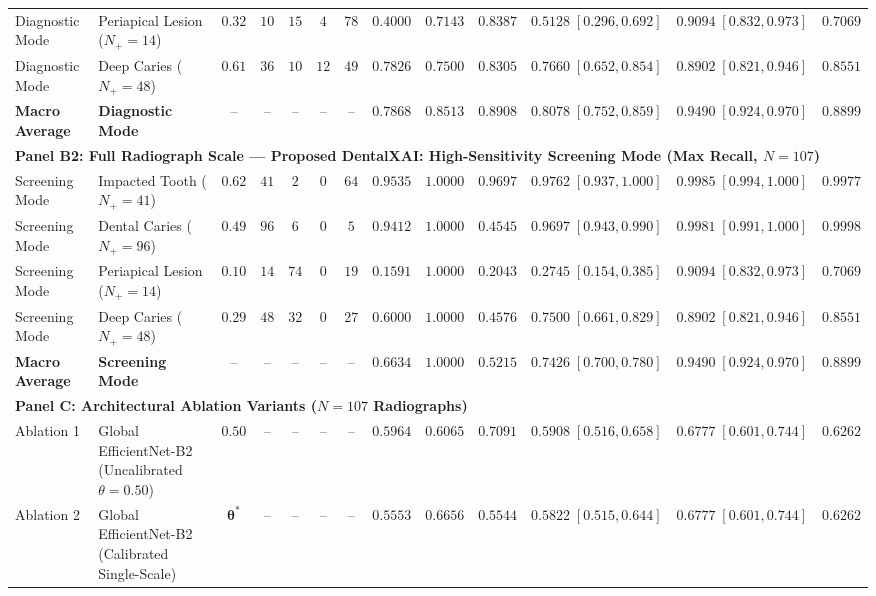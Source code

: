\documentclass[review]{elsarticle}
\begin{document}
\begin{table}[t]
\begin{adjustbox}{width=\textwidth}
\begin{tabular}{llccccccccccc}
Diagnostic Mode & Periapical Lesion ($N_+=14$) & $0.32$ & $10$ & $15$ & $4$ & $78$ & $0.4000$ & $0.7143$ & $0.8387$ & $\mathbf{0.5128}\;[0.296, 0.692]$ & $\mathbf{0.9094}\;[0.832, 0.973]$ & $0.7069$ \\
Diagnostic Mode & Deep Caries ($N_+=48$) & $0.61$ & $36$ & $10$ & $12$ & $49$ & $0.7826$ & $0.7500$ & $0.8305$ & $\mathbf{0.7660}\;[0.652, 0.854]$ & $\mathbf{0.8902}\;[0.821, 0.946]$ & $0.8551$ \\
\textbf{Macro Average} & \textbf{Diagnostic Mode} & -- & -- & -- & -- & -- & $\mathbf{0.7868}$ & $\mathbf{0.8513}$ & $\mathbf{0.8908}$ & $\mathbf{0.8078}\;[0.752, 0.859]$ & $\mathbf{0.9490}\;[0.924, 0.970]$ & $\mathbf{0.8899}$ \\
\midrule
\multicolumn{13}{l}{\textbf{Panel B2: Full Radiograph Scale --- Proposed DentalXAI: High-Sensitivity Screening Mode (Max Recall, $N=107$)}} \\
\midrule
Screening Mode & Impacted Tooth ($N_+=41$) & $0.62$ & $41$ & $2$ & $0$ & $64$ & $0.9535$ & $1.0000$ & $0.9697$ & $\mathbf{0.9762}\;[0.937, 1.000]$ & $\mathbf{0.9985}\;[0.994, 1.000]$ & $0.9977$ \\
Screening Mode & Dental Caries ($N_+=96$) & $0.49$ & $96$ & $6$ & $0$ & $5$ & $0.9412$ & $1.0000$ & $0.4545$ & $\mathbf{0.9697}\;[0.943, 0.990]$ & $\mathbf{0.9981}\;[0.991, 1.000]$ & $0.9998$ \\
Screening Mode & Periapical Lesion ($N_+=14$) & $0.10$ & $14$ & $74$ & $0$ & $19$ & $0.1591$ & $1.0000$ & $0.2043$ & $\mathbf{0.2745}\;[0.154, 0.385]$ & $\mathbf{0.9094}\;[0.832, 0.973]$ & $0.7069$ \\
Screening Mode & Deep Caries ($N_+=48$) & $0.29$ & $48$ & $32$ & $0$ & $27$ & $0.6000$ & $1.0000$ & $0.4576$ & $\mathbf{0.7500}\;[0.661, 0.829]$ & $\mathbf{0.8902}\;[0.821, 0.946]$ & $0.8551$ \\
\textbf{Macro Average} & \textbf{Screening Mode} & -- & -- & -- & -- & -- & $\mathbf{0.6634}$ & $\mathbf{1.0000}$ & $\mathbf{0.5215}$ & $\mathbf{0.7426}\;[0.700, 0.780]$ & $\mathbf{0.9490}\;[0.924, 0.970]$ & $\mathbf{0.8899}$ \\
\midrule
\multicolumn{13}{l}{\textbf{Panel C: Architectural Ablation Variants ($N=107$ Radiographs)}} \\
\midrule
Ablation 1 & Global EfficientNet-B2 (Uncalibrated $\theta=0.50$) & $0.50$ & -- & -- & -- & -- & $0.5964$ & $0.6065$ & $0.7091$ & $0.5908\;[0.516, 0.658]$ & $0.6777\;[0.601, 0.744]$ & $0.6262$ \\
Ablation 2 & Global EfficientNet-B2 (Calibrated Single-Scale) & $\boldsymbol{\theta}^*$ & -- & -- & -- & -- & $0.5553$ & $0.6656$ & $0.5544$ & $0.5822\;[0.515, 0.644]$ & $0.6777\;[0.601, 0.744]$ & $0.6262$ \\
\bottomrule
\end{tabular}
\end{adjustbox}
\end{table}
\end{document}
